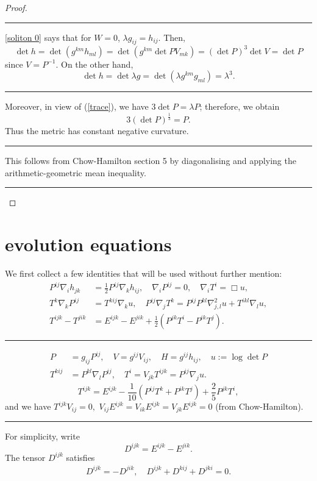\documentclass{amsart}
\theoremstyle{definition}
\theoremstyle{remark}
\numberwithin{equation}{section}
\newenvironment{note}{\hrule}{\hrule}
\begin{document}
\begin{proof}
\begin{note}
\ref{soliton 0} says that for \(W = 0\), \(\lambda g_{ij} = h_{ij}\). Then,
\[
\det h = \det (g^{km} h_{ml}) = \det (g^{km} \det P V_{mk}) = (\det P)^3 \det V = \det P
\]
since \(V=P^{-1}\). On the other hand,
\[
\det h = \det \lambda g = \det (\lambda g^{km} g_{ml}) = \lambda^3.
\]
\end{note}

Moreover, in view of (\ref{trace}), we have $3\det P=\lambda P$; therefore, we obtain $$3(\det P)^{\frac{1}{3}}=P.$$ Thus the metric has constant negative curvature.
\begin{note}
This follows from Chow-Hamilton section 5 by diagonalising and applying the arithmetic-geometric mean inequality.
\end{note}
\end{proof}

\section{evolution equations}
We first collect a few identities that will be used without further mention:
\begin{align}\label{equ: important1}
P^{ij}\nabla_ih_{jk}&=\frac{1}{2}P^{ij}\nabla_kh_{ij},\quad
\nabla_iP^{ij}=0,\quad \nabla_iT^i=\Box u,\\
T^k\nabla_kP^{ij}&=T^{kij}\nabla_ku,\quad P^{ij}\nabla_j T^k=P^{ij}P^{kl}\nabla^2_{j,l}u+T^{ikl}\nabla_lu,\\
T^{ijk}-T^{jik}&=E^{ijk}-E^{jik}+\frac{1}{2}\left(P^{jk}T^i-P^{ik}T^j\right).
\end{align}

\begin{note}
\begin{align*}
P&=g_{ij}P^{ij},\quad V=g^{ij}V_{ij},\quad H=g^{ij}h_{ij},\quad u:=\log\det P\\
T^{kij}&=P^{kl}\nabla_l P^{ij},\quad T^i=V_{jk}T^{ijk}=P^{ij}\nabla_ju.
\end{align*}
\[
T^{ijk}=E^{ijk}-\frac{1}{10}\left(P^{ij}T^k+P^{ik}T^j\right)+\frac{2}{5}P^{jk}T^i,
\]
and we have $T^{ijk}V_{ij}=0,$ $V_{ij}E^{ijk}=V_{ik}E^{ijk}=V_{jk}E^{ijk}=0$ (from Chow-Hamilton).
\end{note}

For simplicity, write
\[D^{ijk}=E^{ijk}-E^{jik}.\]
The tensor $D^{ijk}$ satisfies
\begin{align*}
D^{ijk}=-D^{jik},\quad D^{ijk}+D^{kij}+D^{jki}=0.
\end{align*}
\end{document}
